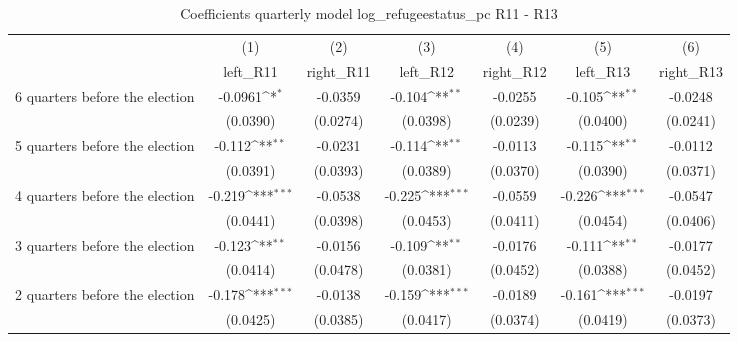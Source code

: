 \begin{table}[htbp]\centering
\def\sym#1{\ifmmode^{#1}\else\(^{#1}\)\fi}
\caption{Coefficients quarterly model log\_refugeestatus\_pc R11 - R13}
\begin{tabular}{l*{6}{c}}
\hline\hline
                    &\multicolumn{1}{c}{(1)}&\multicolumn{1}{c}{(2)}&\multicolumn{1}{c}{(3)}&\multicolumn{1}{c}{(4)}&\multicolumn{1}{c}{(5)}&\multicolumn{1}{c}{(6)}\\
                    &\multicolumn{1}{c}{left\_R11}&\multicolumn{1}{c}{right\_R11}&\multicolumn{1}{c}{left\_R12}&\multicolumn{1}{c}{right\_R12}&\multicolumn{1}{c}{left\_R13}&\multicolumn{1}{c}{right\_R13}\\
\hline
 6 quarters before the election&     -0.0961\sym{*}  &     -0.0359         &      -0.104\sym{**} &     -0.0255         &      -0.105\sym{**} &     -0.0248         \\
                    &    (0.0390)         &    (0.0274)         &    (0.0398)         &    (0.0239)         &    (0.0400)         &    (0.0241)         \\
[1em]
 5 quarters before the election&      -0.112\sym{**} &     -0.0231         &      -0.114\sym{**} &     -0.0113         &      -0.115\sym{**} &     -0.0112         \\
                    &    (0.0391)         &    (0.0393)         &    (0.0389)         &    (0.0370)         &    (0.0390)         &    (0.0371)         \\
[1em]
 4 quarters before the election&      -0.219\sym{***}&     -0.0538         &      -0.225\sym{***}&     -0.0559         &      -0.226\sym{***}&     -0.0547         \\
                    &    (0.0441)         &    (0.0398)         &    (0.0453)         &    (0.0411)         &    (0.0454)         &    (0.0406)         \\
[1em]
 3 quarters before the election&      -0.123\sym{**} &     -0.0156         &      -0.109\sym{**} &     -0.0176         &      -0.111\sym{**} &     -0.0177         \\
                    &    (0.0414)         &    (0.0478)         &    (0.0381)         &    (0.0452)         &    (0.0388)         &    (0.0452)         \\
[1em]
 2 quarters before the election&      -0.178\sym{***}&     -0.0138         &      -0.159\sym{***}&     -0.0189         &      -0.161\sym{***}&     -0.0197         \\
                    &    (0.0425)         &    (0.0385)         &    (0.0417)         &    (0.0374)         &    (0.0419)         &    (0.0373)         \\

\end{tabular}
\end{table}
